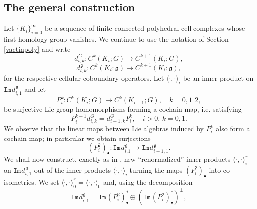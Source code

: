 \documentclass[11pt,reqno]{amsart}
\numberwithin{equation}{section}
\theoremstyle{remark}
\theoremstyle{rmdefinition}
\begin{document}
\subsection{The general construction}
Let $\{K_i\}_{i=0}^{\infty}$ be a sequence of finite connected polyhedral cell complexes whose first homology group vanishes. We continue to use the notation of Section \ref{vactinpoly} and write
$$ d_{i,k}^{\hspace{1pt}G}: C^k(K_i;G)\to  C^{k+1}(K_i;G),$$
$$ d_{i,k}^{\hspace{1pt}\mathfrak g}: C^k(K_i;\mathfrak g)\to  C^{k+1}(K_i;\mathfrak g),$$
for the respective cellular coboundary operators.
Let $\langle \cdot, \cdot \rangle_i$ be an inner product on $\mathtt{Im}\hspace{1pt}d_{i,1}^{\hspace{1pt}\mathfrak g}$ and let
$$P^k_i: C^k(K_i;G) \to C^k(K_{i-1};G), \quad k=0,1,2,$$
be surjective Lie group homomorphisms forming a cochain map, i.e. satisfying
\begin{equation}\label{cochamapco}
	P^{k+1}_{i}d^G_{i,k} =d^G_{i-1,k} P^k_{i},  \quad  i>0, \, k=0,1.
\end{equation}
We observe that the linear maps between Lie algebras induced by $P^k_i$ also form a cochain map; in particular we obtain surjections
\begin{equation}\label{p2bulledef}
 (P^2_i)_{\bullet}: \mathtt{Im}\hspace{1pt}d_{i,1}^{\hspace{1pt}\mathfrak g} \to \mathtt{Im}\hspace{1pt}d_{i-1,1}^{\hspace{1pt}\mathfrak g}.
\end{equation}
We shall now construct, exactly as in \cite[Section 3.2]{Z1}, new ``renormalized'' inner products $\langle \cdot, \cdot \rangle_{i}^r$ on $\mathtt{Im}\hspace{1pt}d_{i,1}^{\hspace{1pt}\mathfrak g}$ out of the inner products $\langle \cdot, \cdot \rangle_{i}$  turning the maps $(P^2_i)_{\bullet}$ into co-isometries. We set 
$ \langle \cdot, \cdot \rangle_{0}^r=\langle \cdot, \cdot \rangle_{0}$
and, using the decomposition
\begin{equation}\label{basiorthde}
	\mathtt{Im}\hspace{1pt}d_{i,1}^{\hspace{1pt}\mathfrak g}=\mathtt{Im}\hspace{1pt}(P^2_{i})_{\bullet}^* \oplus (\mathtt{Im}\hspace{1pt}(P^2_{i})_{\bullet}^*)^{\perp},
\end{equation} 
\end{document}
